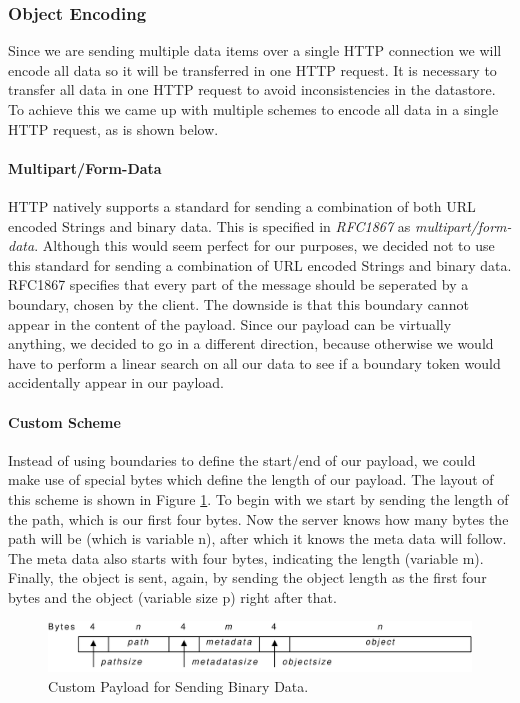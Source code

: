 \subsubsection{Object Encoding} 
Since we are sending multiple data items over a single HTTP connection we will
encode all data so it will be transferred in one HTTP request. It is necessary
to transfer all data in one HTTP request to avoid inconsistencies in the
datastore. To achieve this we came up with multiple schemes to encode all data
in a single HTTP request, as is shown below.

\paragraph{Multipart/Form-Data}
HTTP natively supports a standard for sending a combination of both URL encoded
Strings and binary data. This is specified in \emph{RFC1867} as
\emph{multipart/form-data}. Although this would seem perfect for our purposes, we
decided not to use this standard for sending a combination of URL encoded Strings
and binary data. RFC1867 specifies that every part of the message should be
seperated by a boundary, chosen by the client. The downside is that this boundary
cannot appear in the content of the payload. Since our payload can be virtually
anything, we decided to go in a different direction, because otherwise we would
have to perform a linear search on all our data to see if a boundary token would
accidentally appear in our payload.

\paragraph{Custom Scheme}
Instead of using boundaries to define the start/end of our payload, we could make
use of special bytes which define the length of our payload. The layout of this
scheme is shown in Figure \ref{clientimpl-custom}. To begin with we start by
sending the length of the path, which is our first four bytes. Now the server
knows how many bytes the path will be (which is variable n), after which it knows
the meta data will follow. The meta data also starts with four bytes, indicating
the length (variable m). Finally, the object is sent, again, by sending the
object length as the first four bytes and the object (variable size p) right
after that.

\begin{figure}[ht] %
\begin{center}
\includegraphics[width=12cm]{./figures/custom_payload.pdf} 
\caption{Custom Payload for Sending Binary Data.\label{clientimpl-custom}}
\end{center}
\end{figure}


